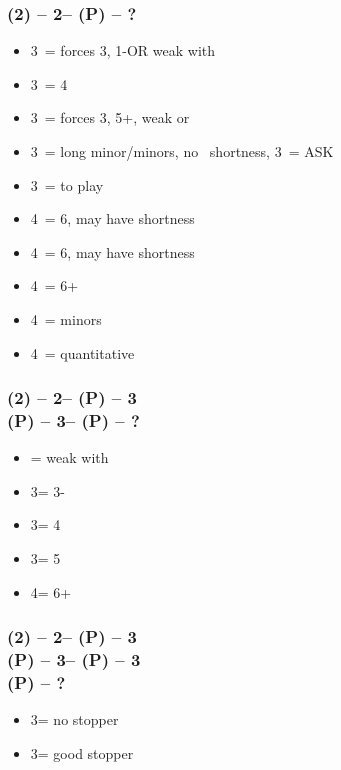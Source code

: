 \subsubsection*{(2\hearts) -- 2\nt -- (P) -- ?}
\begin{itemize}
    \item 3\clubs\ = forces 3\diams, 1-\hearts \gf OR weak with \diams
    \item 3\diams\ = 4\spades \gf
    \item 3\hearts\ = forces 3\spades, 5+\spades, weak or \gf
    \item 3\spades\ = long minor/minors, no \hearts\ shortness, 3\nt\ = ASK
    \item 3\nt\ = to play
    \item 4\clubs\ = 6\spades, may have shortness
    \item 4\diams\ = 6\spades, may have shortness
    \item 4\hearts\ = 6+\spades
    \item 4\spades\ = minors
    \item 4\nt\ = quantitative
\end{itemize}

\subsubsection*{(2\hearts) -- 2\nt -- (P) -- 3\clubs \\
                (P) -- 3\diams -- (P) -- ?}
\begin{itemize}
    \item \pass = weak with \diams
    \item 3\hearts = 3-\spades
    \item 3\spades = 4\spades
    \item 3\nt = 5\spades
    \item 4\clubs = 6+\spades
\end{itemize}

\subsubsection*{(2\hearts) -- 2\nt -- (P) -- 3\clubs \\
                (P) -- 3\diams -- (P) -- 3\hearts \\
                (P) -- ?}
\begin{itemize}
    \item 3\spades = no \hearts stopper
    \item 3\nt = good \hearts stopper
\end{itemize}

